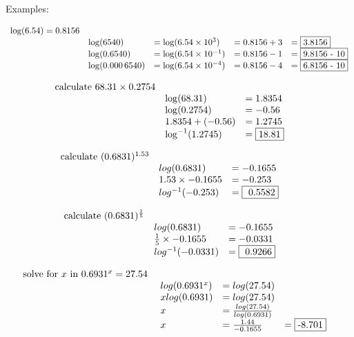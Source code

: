 \documentclass[
]{book}
\begin{document}
Examples:

\[
\begin{array}{lllll}
\log (6.54) =  0.8156 &&&&\\
& \log (6540)         &= \log (6.54 \times 10^3 )   &=  0.8156 + 3 &= \fbox{3.8156}\\
& \log ( 0.6540)      &= \log (6.54 \times 10^{-1}) &=  0.8156 - 1 &= \fbox{9.8156 - 10}\\
& \log ( 0.000\,6540) &= \log (6.54 \times 10^{-4}) &=  0.8156 - 4 &= \fbox{6.8156 - 10}\\
\end{array}
\]

\[
\begin{array}{lllll}
\text{calculate } 68.31 \times  0.2754 &&&&\\
&\log (68.31) &= 1.8354&&\\
&\log ( 0.2754) &= - 0.56&&\\
&1.8354 +(- 0.56) &= 1.2745&&\\
&\log^{-1} (1.2745) &= \fbox{18.81}&&\\
\end{array}
\]

\[
\begin{array}{lllll}
\text{calculate } ( 0.6831)^{1.53} &&&&\\
& log ( 0.6831) &= - 0.1655&&\\
& 1.53 \times - 0.1655 &= - 0.253&&\\
& log^{-1} (- 0.253) &= \fbox{ 0.5582}&&
\end{array}
\]

\[
\begin{array}{lllll}
\text{calculate } ( 0.6831)^{\frac{1}{5}} &&&&\\
& log ( 0.6831) &= - 0.1655&&\\
& \frac{1}{5} \times - 0.1655 &= - 0.0331&&\\
& log^{-1} (- 0.0331) &= \fbox{ 0.9266}&&
\end{array}
\]

\[
\begin{array}{lllll}
\text{solve for \(x\) in \( 0.6931^x = 27.54\) }&&&&\\
& log ( 0.6931^x) &= log (27.54)&&\\
& x log ( 0.6931) &= log (27.54)&&\\
& x &= \frac{log (27.54 )}{log ( 0.6931)}&&\\
& x &= \frac{1.44}{- 0.1655} &= \fbox{-8.701}
\end{array}
\]
\end{document}
